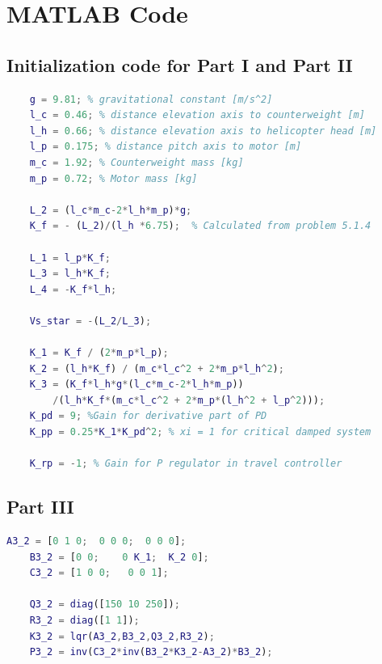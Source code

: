 
\appendix

\section{MATLAB Code} \label{sec:matlab_code}
\subsection{Initialization code for Part I and Part II}
\begin{lstlisting}[caption={Matlab code showing initialization of constants used in the assignment},label={lst:p1p2},language=Matlab]
    %%%%%%%%%%% Physical constants
    g = 9.81; % gravitational constant [m/s^2]
    l_c = 0.46; % distance elevation axis to counterweight [m]
    l_h = 0.66; % distance elevation axis to helicopter head [m]
    l_p = 0.175; % distance pitch axis to motor [m]
    m_c = 1.92; % Counterweight mass [kg]
    m_p = 0.72; % Motor mass [kg]

    L_2 = (l_c*m_c-2*l_h*m_p)*g;
    K_f = - (L_2)/(l_h *6.75);  % Calculated from problem 5.1.4

    L_1 = l_p*K_f;
    L_3 = l_h*K_f;
    L_4 = -K_f*l_h;

    Vs_star = -(L_2/L_3);

    K_1 = K_f / (2*m_p*l_p);
    K_2 = (l_h*K_f) / (m_c*l_c^2 + 2*m_p*l_h^2);
    K_3 = (K_f*l_h*g*(l_c*m_c-2*l_h*m_p))
        /(l_h*K_f*(m_c*l_c^2 + 2*m_p*(l_h^2 + l_p^2)));
    K_pd = 9; %Gain for derivative part of PD
    K_pp = 0.25*K_1*K_pd^2; % xi = 1 for critical damped system

    K_rp = -1; % Gain for P regulator in travel controller
\end{lstlisting}


\subsection{Part III}
\medskip

\begin{lstlisting}[caption={Matlab code showing the calculation of the controllability matrix },label={lst:p3p2},language=Matlab]
    A3_2 = [0 1 0;  0 0 0;  0 0 0];
    B3_2 = [0 0;    0 K_1;  K_2 0];
    C3_2 = [1 0 0;   0 0 1];

    Q3_2 = diag([150 10 250]);
    R3_2 = diag([1 1]);
    K3_2 = lqr(A3_2,B3_2,Q3_2,R3_2);
    P3_2 = inv(C3_2*inv(B3_2*K3_2-A3_2)*B3_2);
\end{lstlisting}

